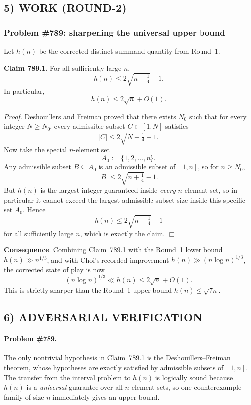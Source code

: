 \subsection*{5) WORK (ROUND-2)}

\subsubsection*{Problem \#789: sharpening the universal upper bound}

Let \(h(n)\) be the corrected distinct-summand quantity from Round~1.

\medskip
\noindent\textbf{Claim 789.1.} For all sufficiently large \(n\),
\[
  h(n) \le 2\sqrt{n+\tfrac14}-1.
\]
In particular,
\[
  h(n) \le 2\sqrt n + O(1).
\]

\medskip
\noindent\emph{Proof.}
Deshouillers and Freiman proved that there exists \(N_0\) such that for every integer \(N\ge N_0\), every admissible subset \(C\subset [1,N]\) satisfies
\[
  |C| \le 2\sqrt{N+\tfrac14}-1.
\]
Now take the special \(n\)-element set
\[
  A_0 := \{1,2,\dots,n\}.
\]
Any admissible subset \(B\subseteq A_0\) is an admissible subset of \([1,n]\), so for \(n\ge N_0\),
\[
  |B| \le 2\sqrt{n+\tfrac14}-1.
\]
But \(h(n)\) is the largest integer guaranteed inside \emph{every} \(n\)-element set, so in particular it cannot exceed the largest admissible subset size inside this specific set \(A_0\). Hence
\[
  h(n) \le 2\sqrt{n+\tfrac14}-1
\]
for all sufficiently large \(n\), which is exactly the claim.
\hfill\(\Box\)

\medskip
\noindent\textbf{Consequence.} Combining Claim~789.1 with the Round~1 lower bound \(h(n)\gg n^{1/3}\), and with Choi's recorded improvement \(h(n)\gg (n\log n)^{1/3}\), the corrected state of play is now
\[
  (n\log n)^{1/3} \ll h(n) \le 2\sqrt n + O(1).
\]
This is strictly sharper than the Round~1 upper bound \(h(n)\le \sqrt{7n}\).

\subsection*{6) ADVERSARIAL VERIFICATION}

\paragraph{Problem \#789.}
The only nontrivial hypothesis in Claim~789.1 is the Deshouillers--Freiman theorem, whose hypotheses are exactly satisfied by admissible subsets of \([1,n]\). The transfer from the interval problem to \(h(n)\) is logically sound because \(h(n)\) is a \emph{universal} guarantee over all \(n\)-element sets, so one counterexample family of size \(n\) immediately gives an upper bound.

